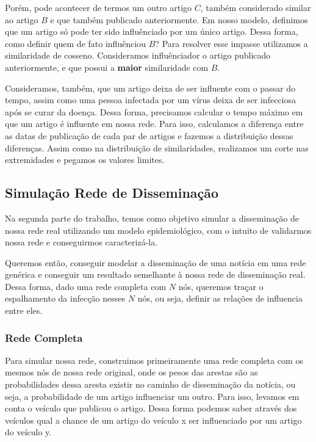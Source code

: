 \documentclass[a4paper,12pt]{article}
\begin{document}
\begin{description}
    \pagebreak

    Porém, pode acontecer de termos um outro artigo $C$, também considerado similar ao artigo $B$ e que também publicado anteriormente. Em nosso modelo,
    definimos que um artigo só pode ter sido influênciado por um único artigo. Dessa forma, como definir quem de fato influênciou $B$? Para
    resolver esse impasse utilizamos a similaridade de cosseno. Consideramos influênciador o artigo publicado anteriormente, e que possui
    a \textbf{maior} similaridade com $B$.
    
    Consideramos, também, que um artigo deixa de ser influente com o passar do tempo, assim como uma pessoa infectada por um vírus deixa
    de ser infecciosa após se curar da doença. Dessa forma, precisamos calcular o tempo máximo em que um artigo é influente em nossa rede.
    Para isso, calculamos a diferença entre as datas de publicação de cada par de artigos e fazemos a distribuição dessas diferenças. Assim como
    na distribuição de similaridades, realizamos um corte nas extremidades e pegamos os valores limites.
 \end{description}
 

\subsection{Simulação Rede de Disseminação}

Na segunda parte do trabalho, temos como objetivo simular a disseminação de nossa rede real utilizando um modelo epidemiológico, com o intuito
de validarmos nossa rede e conseguirmos caracterizá-la.

Queremos então, conseguir modelar a disseminação de uma notícia em uma rede genérica e conseguir um resultado semelhante à nossa rede de
disseminação real. Dessa forma, dado uma rede completa com $N$ nós, queremos traçar o espalhamento da infecção nesses $N$ nós, ou seja, definir
as relações de influencia entre eles.

\subsubsection{Rede Completa}


 Para simular nossa rede, construimos primeiramente uma rede completa com os mesmos nós de nossa rede original, onde os pesos das arestas
 são as probabilidades dessa aresta existir no caminho de disseminação da notícia, ou seja, a probabilidade de um artigo influenciar um 
 outro. Para isso, levamos em conta o veículo que publicou o artigo. Dessa forma podemos saber 
 através dos veículos qual a chance de um artigo do veículo x ser influenciado por um artigo do veículo y.
\end{document}

